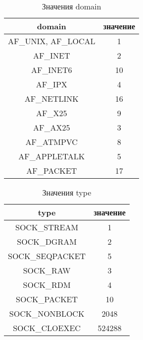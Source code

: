 \documentclass[12t]{article}
\begin{document}
\begin{table}[H]
\caption{\label{domain}Значения domain}
\begin{center}
\begin{tabular}{|c|c|}
\hline
domain & значение \\
\hline
AF\_UNIX, AF\_LOCAL & 1 \\
AF\_INET & 2 \\
AF\_INET6 & 10 \\
AF\_IPX & 4 \\
AF\_NETLINK & 16 \\
AF\_X25 & 9 \\
AF\_AX25 & 3 \\
AF\_ATMPVC & 8 \\
AF\_APPLETALK & 5 \\
AF\_PACKET & 17 \\
\hline
\end{tabular}
\end{center}
\end{table}

\begin{table}[ht]
\caption{\label{type}Значения type}
\begin{center}
\begin{tabular}{|c|c|}
\hline
type & значение \\
\hline
SOCK\_STREAM & 1 \\
SOCK\_DGRAM & 2 \\
SOCK\_SEQPACKET & 5 \\
SOCK\_RAW & 3 \\
SOCK\_RDM & 4 \\
SOCK\_PACKET & 10 \\
SOCK\_NONBLOCK & 2048 \\
SOCK\_CLOEXEC & 524288 \\
\hline
\end{tabular}
\end{center}
\end{table}
\end{document}

